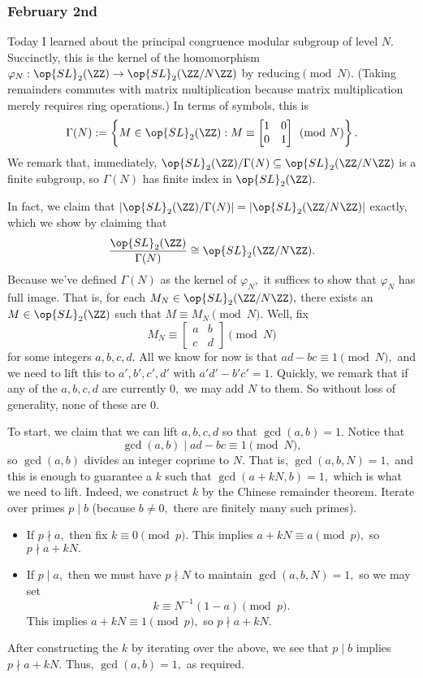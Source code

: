 \subsubsection{February 2nd}
Today I learned about the principal congruence modular subgroup of level $N.$ Succinctly, this is the kernel of the homomorphism $\varphi_N:\op{SL}_2(\ZZ)\to\op{SL}_2(\ZZ/N\ZZ)$ by reducing$\pmod N.$ (Taking remainders commutes with matrix multiplication because matrix multiplication merely requires ring operations.) In terms of symbols, this is
\[\Gamma(N):=\left\{M\in\op{SL}_2(\ZZ) : M\equiv\begin{bmatrix}1 & 0\\0 & 1\end{bmatrix}\pmod N\right\}.\]
We remark that, immediately, $\op{SL}_2(\ZZ)/\Gamma(N)\subseteq\op{SL}_2(\ZZ/N\ZZ)$ is a finite subgroup, so $\Gamma(N)$ has finite index in $\op{SL}_2(\ZZ).$

In fact, we claim that $|\op{SL}_2(\ZZ)/\Gamma(N)|=|\op{SL}_2(\ZZ/N\ZZ)|$ exactly, which we show by claiming that
\[\frac{\op{SL}_2(\ZZ)}{\Gamma(N)}\cong\op{SL}_2(\ZZ/N\ZZ).\]
Because we've defined $\Gamma(N)$ as the kernel of $\varphi_N,$ it suffices to show that $\varphi_N$ has full image. That is, for each $M_N\in\op{SL}_2(\ZZ/N\ZZ),$ there exists an $M\in\op{SL}_2(\ZZ)$ such that $M\equiv M_N\pmod N.$ Well, fix
\[M_N\equiv\begin{bmatrix} a & b \\ c & d \end{bmatrix} \pmod N\]
for some integers $a,b,c,d.$ All we know for now is that $ad-bc\equiv1\pmod N,$ and we need to lift this to $a',b',c',d'$ with $a'd'-b'c'=1.$ Quickly, we remark that if any of the $a,b,c,d$ are currently $0,$ we may add $N$ to them. So without loss of generality, none of these are $0.$

To start, we claim that we can lift $a,b,c,d$ so that $\gcd(a,b)=1.$ Notice that
\[\gcd(a,b)\mid ad-bc\equiv1\pmod N,\]
so $\gcd(a,b)$ divides an integer coprime to $N.$ That is, $\gcd(a,b,N)=1,$ and this is enough to guarantee a $k$ such that $\gcd(a+kN,b)=1,$ which is what we need to lift. Indeed, we construct $k$ by the Chinese remainder theorem. Iterate over primes $p\mid b$ (because $b\ne0,$ there are finitely many such primes).
\begin{itemize}
    \item If $p\nmid a,$ then fix $k\equiv0\pmod p.$ This implies $a+kN\equiv a\pmod p,$ so $p\nmid a+kN.$
    \item If $p\mid a,$ then we must have $p\nmid N$ to maintain $\gcd(a,b,N)=1,$ so we may set
    \[k\equiv N^{-1}(1-a)\pmod p.\]
    This implies $a+kN\equiv1\pmod p,$ so $p\nmid a+kN.$
\end{itemize}
After constructing the $k$ by iterating over the above, we see that $p\mid b$ implies $p\nmid a+kN.$ Thus, $\gcd(a,b)=1,$ as required.

